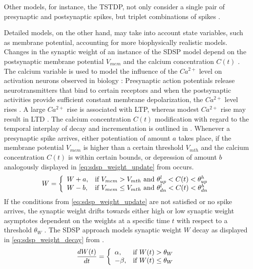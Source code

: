 Other models, for instance, the \ac{TSTDP}, not only consider a single pair of presynaptic and postsynaptic spikes, 
but triplet combinations of spikes \cite{Synaptic_plasticity,STDP_triplet}.

Detailed models, on the other hand, may take into account state variables, such as membrane potential, 
accounting for more biophysically realistic models.
Changes in the synaptic weight of an instance of the \ac{SDSP} model depend on the postsynaptic membrane potential $V_{mem}$ and 
the calcium concentration $C(t)$ \cite{Synaptic_plasticity}.
The calcium variable is used to model the influence of the $Ca^{2+}$ level on activation neurons observed in biology \cite{STDP_hebbian}:
Presynaptic action potentials release neurotransmitters that bind to certain receptors and 
when the postsynaptic activities provide sufficient constant membrane depolarization, the $Ca^{2+}$ level rises \cite{Synaptic_plasticity}.
A large $Ca^{2+}$ rise is associated with \ac{LTP}, whereas modest $Ca^{2+}$ rise may result in \ac{LTD} \cite{STDP_hebbian}.
The calcium concentration $C(t)$  modification with regard to the temporal interplay of decay and incrementation is outlined in \cite{simulation_STDP}.
Whenever a presynaptic spike arrives, either potentiation of amount $a$ takes place, 
if the membrane potential $V_{mem}$ is higher than a certain threshold $V_{mth}$ and the 
calcium concentration $C(t)$ is within certain bounds, 
or depression of amount $b$ analogously displayed in \autoref{eq:sdsp_weight_update} from \cite{Synaptic_plasticity} occurs.
%
\begin{equation}
    \centering
    \label{eq:sdsp_weight_update} 
    W = 
    \left\{
    \begin{array}{ll}
        W + a, & \text{if } V_{mem} > V_{mth} \text{ and } \theta^l_{up} < C(t) < \theta^h_{up}\\
        W - b, & \text{if } V_{mem} \le V_{mth} \text{ and } \theta^l_{dn} < C(t) < \theta^h_{dn}
    \end{array}
    \right.
\end{equation}
%
If the conditions from \autoref{eq:sdsp_weight_update} are not satisfied or no spike arrives, 
the synaptic weight drifts towards either high or low synaptic weight asymptotes dependent on the weights at a specific time $t$ 
with respect to a threshold $\theta_W$ \cite{Synaptic_plasticity}.
The \ac{SDSP} approach models synaptic weight $W$ decay as displayed in \autoref{eq:sdsp_weight_decay} from \cite{Synaptic_plasticity}.
%
\begin{equation}
    \centering
    \label{eq:sdsp_weight_decay}
    \frac{dW(t)}{dt} = 
    \left\{
    \begin{array}{ll}
        \alpha, & \text{if } W(t) > \theta_W\\
        - \beta, & \text{if } W(t) \le \theta_W\\
    \end{array}
    \right.
\end{equation}

